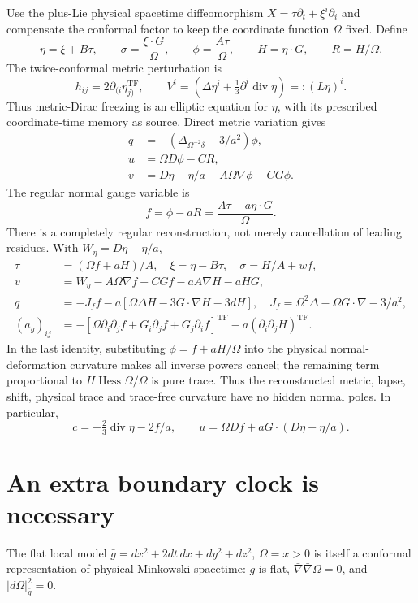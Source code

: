 \documentclass[11pt]{article}
\newcommand{\TF}{\mathrm{TF}}
\begin{document}
Use the plus-Lie physical spacetime diffeomorphism $X=\tau\partial_t+\xi^i\partial_i$ and compensate the conformal factor to keep the coordinate function $\Omega$ fixed. Define
\[
 \eta=\xi+B\tau,\qquad \sigma=\frac{\xi\cdot G}{\Omega},\qquad
 \phi=\frac{A\tau}{\Omega},\qquad H=\eta\cdot G,\qquad R=H/\Omega.
\]
The twice-conformal metric perturbation is
\[
 h_{ij}=2\partial_{(i}\eta_{j)}^{\TF},\qquad
 V^i=(\Delta\eta^i+\tfrac13\partial^i\operatorname{div}\eta)=:(L\eta)^i.
\]
Thus metric-Dirac freezing is an elliptic equation for $\eta$, with its prescribed coordinate-time memory as source. Direct metric variation gives
\begin{align}
 q&=-\left(\Delta_{\Omega^{-2}\delta}-3/a^2\right)\phi,\\
 u&=\Omega D\phi-CR,\\
 v&=D\eta-\eta/a-A\Omega\nabla\phi-CG\phi.
\end{align}
The regular normal gauge variable is
\[
 f=\phi-aR=\frac{A\tau-a\eta\cdot G}{\Omega}.
\]
There is a completely regular reconstruction, not merely cancellation of leading residues. With $W_\eta=D\eta-\eta/a$,
\begin{align}
 \tau&=(\Omega f+aH)/A,\quad \xi=\eta-B\tau,\quad \sigma=H/A+wf,\\
 v&=W_\eta-A\Omega\nabla f-CGf-aA\nabla H-aHG,\\
 q&=-J_f f-a[\Omega\Delta H-3G\cdot\nabla H-3dH],
 \quad J_f=\Omega^2\Delta-\Omega G\cdot\nabla-3/a^2,\\
 (a_g)_{ij}&=-[\Omega\partial_i\partial_jf+G_i\partial_jf+G_j\partial_if]^{\TF}
             -a(\partial_i\partial_jH)^{\TF}.
\end{align}
In the last identity, substituting $\phi=f+aH/\Omega$ into the physical normal-deformation curvature makes all inverse powers cancel; the remaining term proportional to $H\operatorname{Hess}\Omega/\Omega$ is pure trace. Thus the reconstructed metric, lapse, shift, physical trace and trace-free curvature have no hidden normal poles.
In particular,
\begin{equation}
 c=-\tfrac23\operatorname{div}\eta-2f/a,
 \qquad u=\Omega Df+aG\cdot(D\eta-\eta/a).\label{regularfields}
\end{equation}

\section{An extra boundary clock is necessary}
The flat local model $\bar g=dx^2+2dt\,dx+dy^2+dz^2$, $\Omega=x>0$ is itself a conformal representation of physical Minkowski spacetime: $\bar g$ is flat, $\bar\nabla\bar\nabla\Omega=0$, and $|d\Omega|_{\bar g}^2=0$.
\end{document}

